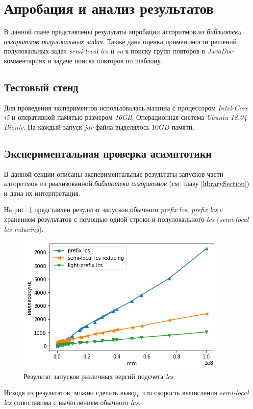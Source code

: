 \section{Апробация и анализ результатов}\label{appob}
В данной главе представлены результаты апробации алгоритмов из \emph{библиотеки алгоритмов полулокальных задач}.
Также дана оценка применимости решений полулокальных задач \emph{semi-local lcs и sa} к поиску групп повторов в \emph{JavaDoc}-комментариях и задаче поиска повторов по шаблону.


\subsection{Тестовый стенд}
Для проведения экспериментов использовалась
машина с процессором \emph{Intel-Core i5} и оперативной памятью размером \emph{16GB}.
Операционная система \emph{Ubuntu 18.04 Bionic}.
На каждый запуск \emph{jar}-файла выделялось $10GB$ памяти.

\subsection{Экспериментальная проверка асимптотики}
В данной секции описаны экспериментальные результаты запусков части алгоритмов из реализованной \emph{библиотеки алгоритмов} (см. главу \ref{librarySection})  и дана их интерпретация.

На рис. \ref{fig:speedlcs} представлен результат запусков
обычного \emph{prefix lcs}, \emph{prefix lcs} с хранением результатов с помощью одной строки и полулокального \emph{lcs} (\emph{semi-local lcs reducing}).
\begin{figure}[h]
\centering
    \includegraphics[width=0.6\columnwidth]{figures/semiLocalvsPrefixLCS.png}
    \caption{Результат запусков различных версий подсчета \emph{lcs} }\label{fig:speedlcs}
\end{figure}
Исходя из результатов, можно сделать вывод, что скорость вычисления \emph{semi-local lcs} сопоставима с вычислением обычного \emph{lcs}.


